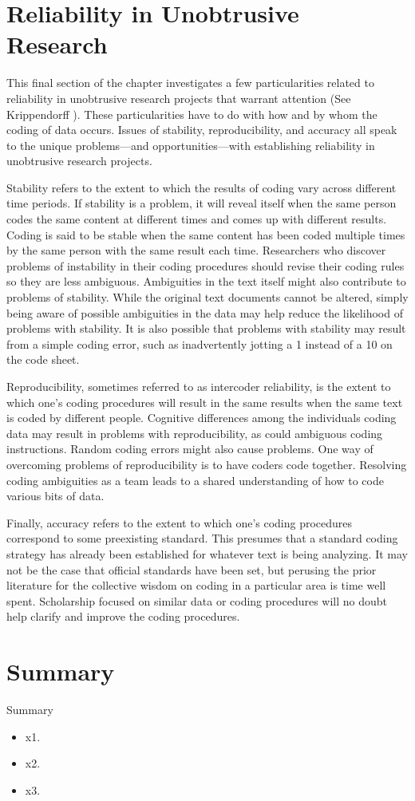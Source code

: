 \section{Reliability in Unobtrusive Research}

This final section of the chapter investigates a few particularities related to reliability in unobtrusive research projects that warrant attention (See Krippendorff \cite{krippendorff2009testing}). These particularities have to do with how and by whom the coding of data occurs. Issues of stability, reproducibility, and accuracy all speak to the unique problems---and opportunities---with establishing reliability in unobtrusive research projects.

Stability refers to the extent to which the results of coding vary across different time periods. If stability is a problem, it will reveal itself when the same person codes the same content at different times and comes up with different results. Coding is said to be stable when the same content has been coded multiple times by the same person with the same result each time. Researchers who discover problems of instability in their coding procedures should revise their coding rules so they are less ambiguous. Ambiguities in the text itself might also contribute to problems of stability. While the original text documents cannot be altered, simply being aware of possible ambiguities in the data may help reduce the likelihood of problems with stability. It is also possible that problems with stability may result from a simple coding error, such as inadvertently jotting a 1 instead of a 10 on the code sheet.

Reproducibility, sometimes referred to as intercoder reliability, is the extent to which one's coding procedures will result in the same results when the same text is coded by different people. Cognitive differences among the individuals coding data may result in problems with reproducibility, as could ambiguous coding instructions. Random coding errors might also cause problems. One way of overcoming problems of reproducibility is to have coders code together. Resolving coding ambiguities as a team leads to a shared understanding of how to code various bits of data.

Finally, accuracy refers to the extent to which one's coding procedures correspond to some preexisting standard. This presumes that a standard coding strategy has already been established for whatever text is being analyzing. It may not be the case that official standards have been set, but perusing the prior literature for the collective wisdom on coding in a particular area is time well spent. Scholarship focused on similar data or coding procedures will no doubt help clarify and improve the coding procedures.

\section{Summary}\label{ch12:summary}

\begin{center}
	\begin{tkawybox}{Summary}
		\begin{itemize}		
			\item x1.
			\item x2.
			\item x3.
		\end{itemize}
	\end{tkawybox}
\end{center}


